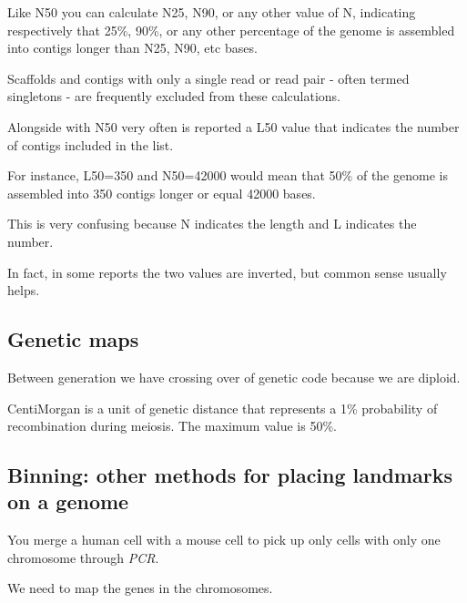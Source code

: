Like N50 you can calculate N25, N90, or any other value of N, indicating
respectively that 25\%, 90\%, or any other percentage of the genome is
assembled into contigs longer than N25, N90, etc bases.

Scaffolds and contigs with only a single read or read pair - often termed
singletons - are frequently excluded from these calculations.

Alongside with N50 very often is reported a L50 value that indicates the
number of contigs included in the list.

For instance, L50=350 and N50=42000 would mean that 50\% of the genome
is assembled into 350 contigs longer or equal 42000 bases.

This is very confusing because N indicates the length and L indicates
the number.

In fact, in some reports the two values are inverted, but common sense usually
helps.

\subsection{Genetic maps}
Between generation we have crossing over of genetic code because we are diploid.

CentiMorgan is a unit of genetic distance that represents a 1\% probability of 
recombination during meiosis. The maximum value is 50\%.

\subsection{Binning: other methods for placing landmarks on a genome}

You merge a human cell with a mouse cell to pick up only cells with only one 
chromosome through \textit{PCR}.

We need to map the genes in the chromosomes.
